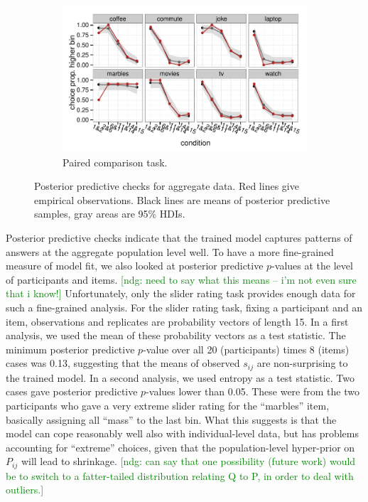 \documentclass[10pt,letterpaper]{article}
\newcommand{\ndg}[1]{\textcolor{Green}{[ndg: #1]}}
\begin{document}
\begin{figure}
  \begin{subfigure}[b]{0.5\textwidth}
    \includegraphics[width = \textwidth]{plots/ppc_choice.pdf}
    \caption{Paired comparison task.}
    \label{fig:lightingPPC}
  \end{subfigure}

  \caption{Posterior predictive checks for aggregate data. Red lines give empirical
    observations. Black lines are means of posterior predictive samples, gray areas are
    95\% HDIs.}
  \label{fig:PPCs}
\end{figure}

Posterior predictive checks indicate that the trained model captures patterns of answers at the
aggregate population level well. To have a more fine-grained measure of model fit, we also
looked at posterior predictive $p$-values at the level of participants and items. \ndg{need to say what this means -- i'm not even sure that i know!} Unfortunately,
only the slider rating task provides enough data for such a fine-grained analysis. For the
slider rating task, fixing a participant and an item, observations and replicates are probability
vectors of length 15. In a first analysis, we used the mean of these probability vectors as a
test statistic. The minimum posterior predictive $p$-value over all 20 (participants) times 8
(items) cases was 0.13, suggesting that the means of observed $s_{ij}$ are non-surprising to
the trained model. In a second analysis, we used entropy as a test statistic. Two cases gave
posterior predictive $p$-values lower than 0.05. These were from the two participants who gave a
very extreme slider rating for the ``marbles'' item, basically assigning all ``mass'' to the
last bin. What this suggests is that the model can cope reasonably well also with
individual-level data, but has problems accounting for ``extreme'' choices, given that the
population-level hyper-prior on $P_{ij}$ will lead to shrinkage.
\ndg{can say that one possibility (future work) would be to switch to a fatter-tailed distribution relating Q to P, in order to deal with outliers.}
\end{document}
